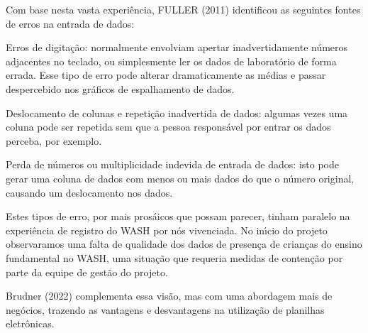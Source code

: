 \documentclass[
12pt,		%
openright,	%
twoside,  %
a4paper,			%
chapter=TITLE,		%
english,			%
french,				%
spanish,			%
brazil				%
]{USPSC-classe/USPSC}
\begin{document}
Com base nesta vasta experi\^encia,  FULLER (2011) identificou as seguintes fontes de erros na entrada de dados:


















\begin{alineas}
\item Erros de digita\c{c}\~ao: normalmente envolviam apertar inadvertidamente n\'umeros adjacentes no teclado, ou simplesmente ler os dados de laborat\'orio de forma errada. Esse tipo de erro pode alterar dramaticamente as m\'edias e passar despercebido nos gr\'aficos de espalhamento de dados.
\item Deslocamento de colunas e repeti\c{c}\~ao inadvertida de dados: algumas vezes uma coluna pode ser repetida sem que a pessoa respons\'avel por entrar os dados perceba, por exemplo.
\item Perda de n\'umeros ou multiplicidade indevida de entrada de dados: isto pode gerar uma coluna de dados com menos ou mais dados do que o n\'umero original, causando um deslocamento nos dados.
\end{alineas}

Estes tipos de erro, por mais pros\'aicos que possam parecer, tinham paralelo na experi\^encia de registro do WASH por n\'os vivenciada. No in\'{\i}cio do projeto observaramos uma falta de qualidade dos dados de presen\c{c}a de crian\c{c}as do ensino fundamental no WASH, uma situa\c{c}\~ao que requeria medidas de conten\c{c}\~ao por parte da equipe de gest\~ao do projeto.

















 Brudner (2022) complementa essa vis\~ao, mas com uma abordagem mais de neg\'ocios, trazendo as vantagens e desvantagens na utiliza\c{c}\~ao de planilhas eletr\^onicas.
\end{document}
